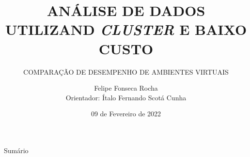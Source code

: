 \documentclass[10pt,brazil]{beamer}
\theoremstyle{definition}
\begin{document}

\title[]{ANÁLISE DE DADOS UTILIZAND \emph{CLUSTER} E BAIXO CUSTO}
\subtitle{COMPARAÇÃO DE DESEMPENHO DE AMBIENTES VIRTUAIS}


\author[Felipe Rocha]{Felipe Fonseca Rocha \\
  \vspace{0.25cm}
  Orientador: Ítalo Fernando Scotá Cunha}
\date{09 de Fevereiro de 2022}

\AtBeginSubsection{%
  \begin{frame}
    \tableofcontents[currentsection,sectionstyle=show/shaded,subsectionstyle=show/hide/hide]
  \end{frame}
}
\frame{\maketitle}


\begin{frame}{Sumário}
  \tableofcontents[hideallsubsections]
\end{frame}


%
%

\end{document}
